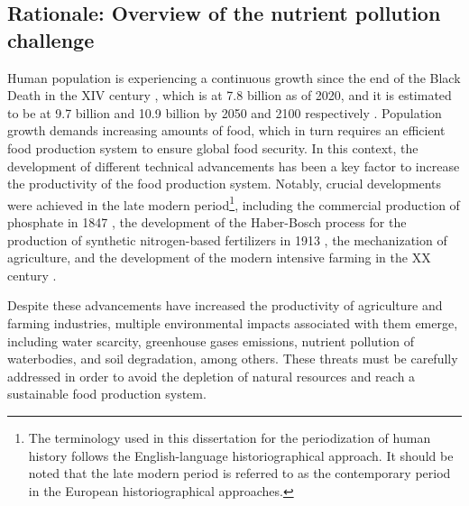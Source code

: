 \begin{refsection}[referencesCh1]

\section{Rationale: Overview of the nutrient pollution \newline challenge}
Human population is experiencing a continuous growth since the end of the Black Death in the XIV century \citep{biraben1980essay}, which is at 7.8 billion as of 2020, and it is estimated to be at 9.7 billion and 10.9 billion by 2050 and 2100 respectively \citep{UNPopulationProspects}. Population growth demands increasing amounts of food, which in turn requires an efficient food production system to ensure global food security.
In this context, the development of different technical advancements has been a key factor to increase the productivity of the food production system. Notably, crucial developments were achieved in the late modern period\footnote{The terminology used in this dissertation for the periodization of human history follows the English-language historiographical approach. It should be noted that the late modern period is referred to as the contemporary period in the European historiographical approaches.}, including the commercial production of phosphate in 1847 \citep{Samreen2019}, the development of the Haber-Bosch process for the production of synthetic nitrogen-based fertilizers in 1913 \citep{smil1999detonator}, the mechanization of agriculture, and the development of the modern intensive farming in the XX century \citep{constable2003century,nierenberg2005happier}.

Despite these advancements have increased the productivity of agriculture and farming industries, multiple environmental impacts associated with them emerge, including water scarcity, greenhouse gases emissions, nutrient pollution of waterbodies, and soil degradation, among others. These threats must be carefully addressed in order to avoid the depletion of natural resources and reach a sustainable food production system.


\end{refsection}

